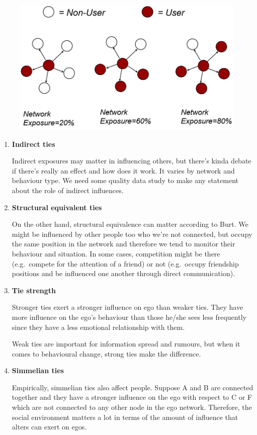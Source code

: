 \documentclass[
  notitlepage,
  onecolumn,
  openany]{book}
\begin{document}
\begin{figure}[h!]

{\centering \includegraphics[width=0.5\linewidth]{images/14-Christakis and Valente/Untitled 3} 

}

\end{figure}

\begin{enumerate}
\def\labelenumi{\arabic{enumi}.}
\setcounter{enumi}{1}
\item
  \textbf{Indirect ties}

  Indirect exposures may matter in influencing others, but there's kinda debate if there's really an effect and how does it work. It varies by network and behaviour type. We need some quality data study to make any statement about the role of indirect influences.
\item
  \textbf{Structural equivalent ties}

  On the other hand, structural equivalence can matter according to Burt. We might be influenced by other people too who we're not connected, but occupy the same position in the network and therefore we tend to monitor their behaviour and situation. In some cases, competition might be there (e.g.~compete for the attention of a friend) or not (e.g.~occupy friendship positions and be influenced one another through direct communication).
\item
  \textbf{Tie strength}

  Stronger ties exert a stronger influence on ego than weaker ties. They have more influence on the ego's behaviour than those he/she sees less frequently since they have a less emotional relationship with them.

  Weak ties are important for information spread and rumours, but when it comes to behavioural change, strong ties make the difference.
\item
  \textbf{Simmelian ties}

  Empirically, simmelian ties also affect people. Suppose A and B are connected together and they have a stronger influence on the ego with respect to C or F which are not connected to any other node in the ego network. Therefore, the social environment matters a lot in terms of the amount of influence that alters can exert on egos.


\end{enumerate}
\end{document}
